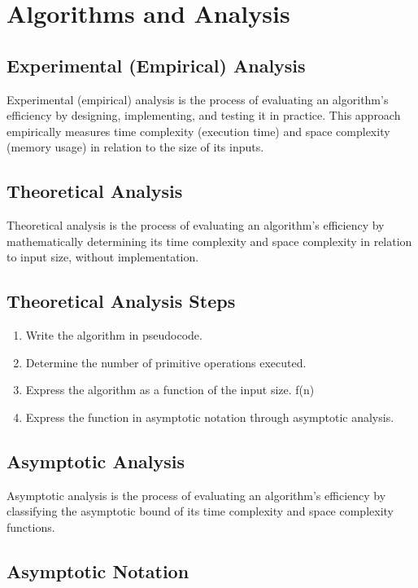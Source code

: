 \chapter{Algorithms and Analysis}

\section{Experimental (Empirical) Analysis}

Experimental (empirical) analysis is the process of evaluating an algorithm's efficiency by designing, implementing, and testing it in practice. This approach empirically measures time complexity (execution time) and space complexity (memory usage) in relation to the size of its inputs.

\section{Theoretical Analysis}

Theoretical analysis is the process of evaluating an algorithm's efficiency by mathematically determining its time complexity and space complexity in relation to input size, without implementation.

\section{Theoretical Analysis Steps}

\begin{enumerate}
  \item Write the algorithm in pseudocode.
  \item Determine the number of primitive operations executed.
  \item Express the algorithm as a function of the input size. f(n)
  \item Express the function in asymptotic notation through asymptotic analysis.
\end{enumerate}

\section{Asymptotic Analysis}

Asymptotic analysis is the process of evaluating an algorithm's efficiency by classifying the asymptotic bound of its time complexity and space complexity functions.

\section{Asymptotic Notation}

